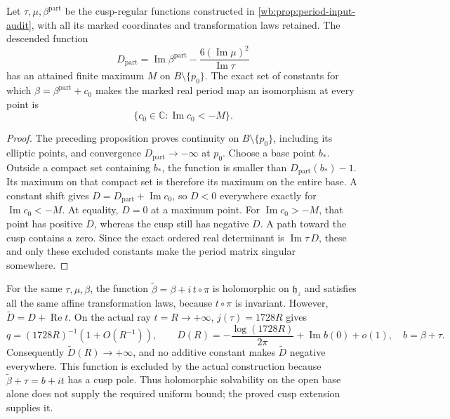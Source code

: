 \begin{proposition}
\label{wb:prop:period-exact-admissible-constants}
Let \(\tau,\mu,\beta^{\mathrm{part}}\) be the cusp-regular functions
constructed in \cref{wb:prop:period-input-audit}, with all its marked
coordinates and transformation laws retained.  The descended function
\[
 D_{\mathrm{part}}=
 \operatorname{Im}\beta^{\mathrm{part}}
 -\frac{6(\operatorname{Im}\mu)^2}{\operatorname{Im}\tau}
\]
has an attained finite maximum \(M\) on
\(B\setminus\{p_0\}\).  The exact set of constants for which
\(\beta=\beta^{\mathrm{part}}+c_0\) makes the marked real period map an
isomorphism at every point is
\[
 \{c_0\in\mathbb C:\operatorname{Im}c_0<-M\}.
\]
\end{proposition}

\begin{proof}
The preceding proposition proves continuity on
\(B\setminus\{p_0\}\), including its elliptic points, and convergence
\(D_{\mathrm{part}}\to-\infty\) at \(p_0\).  Choose a base point
\(b_*\).  Outside a compact set containing \(b_*\), the function is
smaller than \(D_{\mathrm{part}}(b_*)-1\).  Its maximum on that compact
set is therefore its maximum on the entire base.  A constant shift gives
\(D=D_{\mathrm{part}}+\operatorname{Im}c_0\), so \(D<0\) everywhere
exactly for \(\operatorname{Im}c_0<-M\).  At equality, \(D=0\) at a
maximum point.  For \(\operatorname{Im}c_0>-M\), that point has positive
\(D\), whereas the cusp still has negative \(D\).  A path toward the
cusp contains a zero.  Since the exact ordered real determinant is
\(\operatorname{Im}\tau\,D\), these and only these excluded constants
make the period matrix singular somewhere.
\end{proof}

\begin{remark}
For the same \(\tau,\mu,\beta\), the function
\(\widetilde\beta=\beta+i\,t\circ\pi\) is holomorphic on
\(\mathfrak h_z\) and satisfies all the same affine transformation laws,
because \(t\circ\pi\) is invariant.  However,
\(\widetilde D=D+\operatorname{Re}t\).  On the actual ray \(t=R\to+\infty\),
\(j(\tau)=1728R\) gives
\[
 q=(1728R)^{-1}(1+O(R^{-1})),\qquad
 D(R)=-\frac{\log(1728R)}{2\pi}
       +\operatorname{Im}b(0)+o(1),
 \quad b=\beta+\tau.
\]
Consequently \(\widetilde D(R)\to+\infty\), and no additive constant
makes \(\widetilde D\) negative everywhere.  This function is excluded
by the actual construction because
\(\widetilde\beta+\tau=b+i t\) has a cusp pole.  Thus holomorphic
solvability on the open base alone does not supply the required uniform
bound; the proved cusp extension supplies it.
\end{remark}


